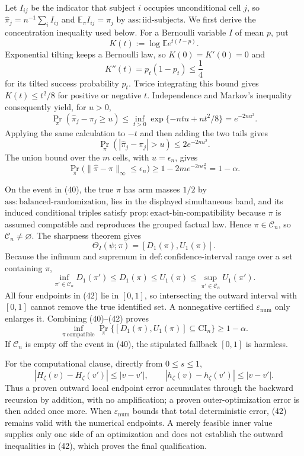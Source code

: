 Let \(I_{ij}\) be the indicator that subject \(i\) occupies unconditional cell \(j\), so \(\widehat\pi_j=n^{-1}\sum_i I_{ij}\) and \(\mathbb E_\pi I_{ij}=\pi_j\) by \(\mathrm{ass{:}iid\text{-}subjects}\).  We first derive the concentration inequality used below.  For a Bernoulli variable \(I\) of mean \(p\), put
\[
 K(t):=\log\mathbb E e^{t(I-p)}.
\]
Exponential tilting keeps a Bernoulli law, so \(K(0)=K'(0)=0\) and
\[
 K''(t)=p_t(1-p_t)\le\frac14
\]
for its tilted success probability \(p_t\).  Twice integrating this bound gives \(K(t)\le t^2/8\) for positive or negative \(t\).  Independence and Markov's inequality consequently yield, for \(u>0\),
\[
 \Pr_\pi(\widehat\pi_j-\pi_j\ge u)
 \le\inf_{t>0}\exp\{-ntu+nt^2/8\}=e^{-2nu^2}.
\]
Applying the same calculation to \(-t\) and then adding the two tails gives
\[
 \Pr_\pi(|\widehat\pi_j-\pi_j|>u)\le2e^{-2nu^2}.            \tag{39}
\]
The union bound over the \(m\) cells, with \(u=\epsilon_n\), gives
\[
 \Pr_\pi\bigl(\|\widehat\pi-\pi\|_\infty\le\epsilon_n\bigr)
 \ge1-2m e^{-2n\epsilon_n^2}=1-\alpha.                     \tag{40}
\]

On the event in (40), the true \(\pi\) has arm masses \(1/2\) by \(\mathrm{ass{:}balanced\text{-}randomization}\), lies in the displayed simultaneous band, and its induced conditional triples satisfy \(\mathrm{prop{:}exact\text{-}bin\text{-}compatibility}\) because \(\pi\) is assumed compatible and reproduces the grouped factual law.  Hence \(\pi\in\mathcal C_n\), so \(\mathcal C_n\ne\varnothing\).  The sharpness theorem gives
\[
 \Theta_I(\psi;\pi)=[D_1(\pi),U_1(\pi)].                   \tag{41}
\]
Because the infimum and supremum in \(\mathrm{def{:}confidence\text{-}interval}\) range over a set containing \(\pi\),
\[
 \inf_{\pi'\in\mathcal C_n}D_1(\pi')
 \le D_1(\pi)\le U_1(\pi)
 \le\sup_{\pi'\in\mathcal C_n}U_1(\pi').                 \tag{42}
\]
All four endpoints in (42) lie in \([0,1]\), so intersecting the outward interval with \([0,1]\) cannot remove the true identified set.  A nonnegative certified \(\varepsilon_{\mathrm{num}}\) only enlarges it.  Combining (40)--(42) proves
\[
 \inf_{\pi\ \mathrm{compatible}}
 \Pr_\pi\{[D_1(\pi),U_1(\pi)]\subseteq\mathrm{CI}_n\}
 \ge1-\alpha.
\]
If \(\mathcal C_n\) is empty off the event in (40), the stipulated fallback \([0,1]\) is harmless.

For the computational clause, directly from \(0\le s\le1\),
\[
 |H_\zeta(v)-H_\zeta(v')|\le|v-v'|,
 \quad\quad |h_\zeta(v)-h_\zeta(v')|\le|v-v'|.                \tag{43}
\]
Thus a proven outward local endpoint error accumulates through the backward recursion by addition, with no amplification; a proven outer-optimization error is then added once more.  When \(\varepsilon_{\mathrm{num}}\) bounds that total deterministic error, (42) remains valid with the numerical endpoints.  A merely feasible inner value supplies only one side of an optimization and does not establish the outward inequalities in (42), which proves the final qualification.
